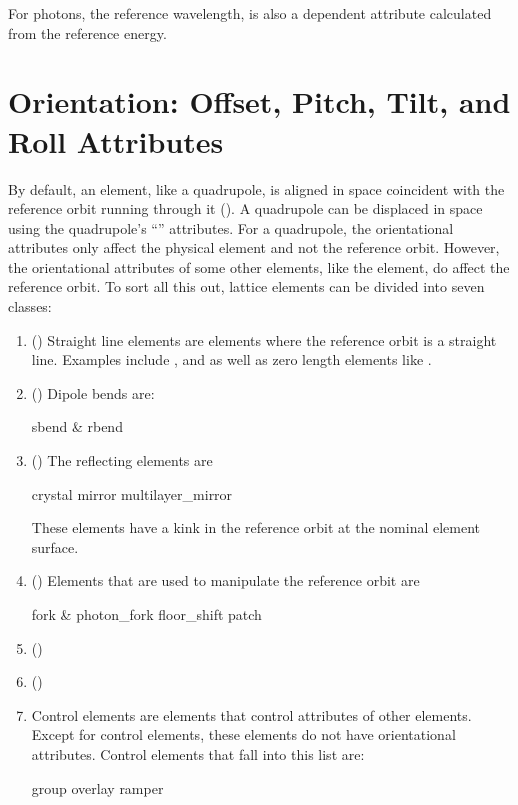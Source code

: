 For photons, the reference wavelength,  is also a dependent attribute calculated
from the reference energy.

\vfill

\section{Orientation: Offset, Pitch, Tilt, and Roll Attributes}
\label{s:offset}

By default, an element, like a quadrupole, is aligned in space coincident with the reference orbit
running through it (). A quadrupole can be displaced in space using the
quadrupole's ``'' attributes. For a quadrupole, the orientational attributes only
affect the physical element and not the reference orbit. However, the orientational attributes of
some other elements, like the  element, do affect the reference orbit. To sort all this
out, lattice elements can be divided into seven classes:
  \begin{enumerate}
%
\item{} () \Newline
Straight line elements are elements where the reference orbit is a straight line. Examples include
, and  as well as zero length elements like .
%
\item{} () \Newline
Dipole bends are:
\begin{example}
  sbend \& rbend
\end{example}
%
\item{} () \Newline
The reflecting elements are
\begin{example}
  crystal
  mirror
  multilayer_mirror
\end{example}
These elements have a kink in the reference orbit at the nominal
element surface.
%
\item{} () \Newline
Elements that are used to manipulate the reference orbit are
\begin{example}
  fork \& photon_fork
  floor_shift
  patch
\end{example}
%
\item{} () \Newline
%
\item{} () \Newline
%
\item{} \Newline
Control elements are elements that control attributes of other elements. Except for 
control elements, these elements do not have orientational attributes. Control elements that fall
into this list are:
\begin{example}
  group
  overlay
  ramper
\end{example}
  \end{enumerate}

